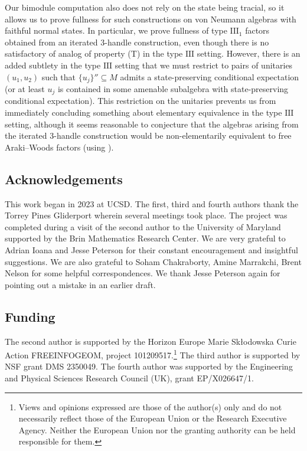 \documentclass[10pt]{amsart}
\numberwithin{equation}{section}
\theoremstyle{definition}
\begin{document}
Our bimodule computation also does not rely on the state being tracial, so it allows us to prove fullness for such constructions on von Neumann algebras with faithful normal states.  In particular, we prove fullness of type $\mathrm{III}_1$ factors obtained from an iterated $3$-handle construction, even though there is no satisfactory of analog of property (T) in the type $\mathrm{III}$ setting.  However, there is an added subtlety in the type $\mathrm{III}$ setting that we must restrict to pairs of unitaries $(u_1,u_2)$ such that $\{u_j\}'' \subseteq M$ admits a state-preserving conditional expectation (or at least $u_j$ is contained in some amenable subalgebra with state-preserving conditional expectation).  This restriction on the unitaries prevents us from immediately concluding something about elementary equivalence in the type $\mathrm{III}$ setting, although it seems reasonable to conjecture that the algebras arising from the iterated $3$-handle construction would be non-elementarily equivalent to free Araki--Woods factors (using \cite{hayes2024generalsolidityphenomenaanticoarse}).

\subsection*{Acknowledgements}

This work began in 2023 at UCSD. The first, third and fourth authors thank the Torrey Pines Gliderport wherein several meetings took place. The project was completed during a visit of the second author to the University of Maryland supported by the Brin Mathematics Research Center. We are very grateful to Adrian Ioana and Jesse Peterson for their constant encouragement and insightful suggestions. We are also grateful to Soham Chakraborty, Amine Marrakchi, Brent Nelson for some helpful correspondences. We thank Jesse Peterson again for pointing out a mistake in an earlier draft.

\subsection*{Funding}

The second author is supported by the Horizon Europe Marie Sk{\l}odowska Curie Action FREEINFOGEOM, project 101209517.\footnote{Views and opinions expressed are those of the author(s) only and do not necessarily reflect those of the European Union or the Research Executive Agency. Neither the European Union nor the granting authority can be held responsible for them.}
The third author is supported by NSF grant DMS 2350049. The fourth author was supported by the Engineering and Physical Sciences Research Council (UK), grant EP/X026647/1.  
\end{document}
